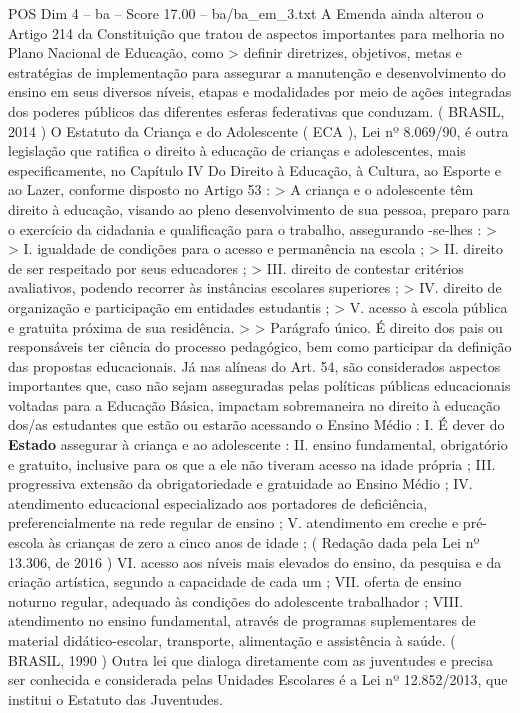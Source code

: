 \begin{textsample}{POS Dim 4 – ba – Score 17.00 – ba/ba\_em\_3.txt}
A Emenda ainda alterou o Artigo 214 da Constituição que tratou de aspectos importantes para melhoria no Plano Nacional de Educação, como > definir diretrizes, objetivos, metas e estratégias de implementação para assegurar a manutenção e desenvolvimento do ensino em seus diversos níveis, etapas e modalidades por meio de ações integradas dos poderes públicos das diferentes esferas federativas que conduzam. ( BRASIL, 2014 ) O Estatuto da Criança e do Adolescente ( ECA ), Lei nº 8.069/90, é outra legislação que ratifica o direito à educação de crianças e adolescentes, mais especificamente, no Capítulo IV Do Direito à Educação, à Cultura, ao Esporte e ao Lazer, conforme disposto no Artigo 53 : > A criança e o adolescente têm direito à educação, visando ao pleno desenvolvimento de sua pessoa, preparo para o exercício da cidadania e qualificação para o trabalho, assegurando -se-lhes : > > I. igualdade de condições para o acesso e permanência na escola ; > II. direito de ser respeitado por seus educadores ; > III. direito de contestar critérios avaliativos, podendo recorrer às instâncias escolares superiores ; > IV. direito de organização e participação em entidades estudantis ; > V. acesso à escola pública e gratuita próxima de sua residência. > > Parágrafo único.
É direito dos pais ou responsáveis ter ciência do processo pedagógico, bem como participar da definição das propostas educacionais.
Já nas alíneas do Art. 54, são considerados aspectos importantes que, caso não sejam asseguradas pelas políticas públicas educacionais voltadas para a Educação Básica, impactam sobremaneira no direito à educação dos/as estudantes que estão ou estarão acessando o Ensino Médio : I.
É dever do \textbf{Estado} assegurar à criança e ao adolescente : II. ensino fundamental, obrigatório e gratuito, inclusive para os que a ele não tiveram acesso na idade própria ; III. progressiva extensão da obrigatoriedade e gratuidade ao Ensino Médio ; IV. atendimento educacional especializado aos portadores de deficiência, preferencialmente na rede regular de ensino ; V. atendimento em creche e pré-escola às crianças de zero a cinco anos de idade ; ( Redação dada pela Lei nº 13.306, de 2016 ) VI. acesso aos níveis mais elevados do ensino, da pesquisa e da criação artística, segundo a capacidade de cada um ; VII. oferta de ensino noturno regular, adequado às condições do adolescente trabalhador ; VIII. atendimento no ensino fundamental, através de programas suplementares de material didático-escolar, transporte, alimentação e assistência à saúde. ( BRASIL, 1990 ) Outra lei que dialoga diretamente com as juventudes e precisa ser conhecida e considerada pelas Unidades Escolares é a Lei nº 12.852/2013, que institui o Estatuto das Juventudes.

\end{textsample}
